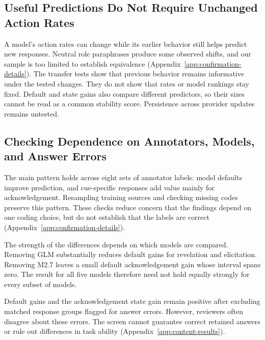 

\subsection{Useful Predictions Do Not Require Unchanged Action Rates}
A model's action rates can change while its earlier behavior still helps
predict new responses. Neutral role paraphrases produce some observed shifts,
and our sample is too limited to establish equivalence
(Appendix~\ref{app:confirmation-details}). The transfer tests show that previous
behavior remains informative under the tested changes. They do not show that
rates or model rankings stay fixed. Default and state gains also compare
different predictors, so their sizes cannot be read as a common stability
score. Persistence across provider updates remains untested.

\subsection{Checking Dependence on Annotators, Models, and Answer Errors}
The main pattern holds across eight sets of annotator labels: model defaults
improve prediction, and cue-specific responses add value mainly for
acknowledgement. Resampling training sources and checking missing codes
preserve this pattern. These checks reduce concern that the findings depend
on one coding choice, but do not establish that the labels are correct
(Appendix~\ref{app:confirmation-details}).

The strength of the differences depends on which models are compared.
Removing GLM substantially reduces default gains for revelation and elicitation.
Removing M2.7 leaves a small default acknowledgement gain whose interval spans
zero. The result for all five models therefore need not hold equally strongly for every
subset of models.

Default gains and the acknowledgement state gain remain positive after excluding
matched response groups flagged for answer errors. However, reviewers often
disagree about these errors. The screen cannot guarantee correct retained
answers or rule out differences in task ability
(Appendix~\ref{app:content-results}).
